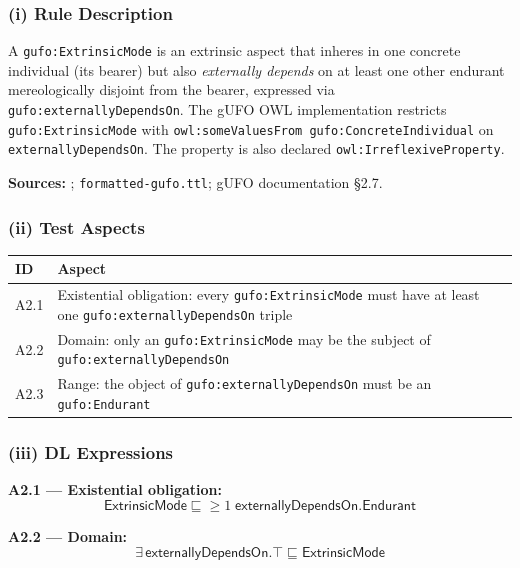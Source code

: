 \documentclass[12pt,a4paper]{article}
\newcommand{\gufoclass}[1]{\nolinkurl{gufo:#1}}
\newcommand{\gufoprop}[1]{\nolinkurl{gufo:#1}}
\begin{document}
\subsubsection*{(i) Rule Description}

A \gufoclass{ExtrinsicMode} is an extrinsic aspect that inheres in one concrete
individual (its bearer) but also \emph{externally depends} on at least one other
endurant mereologically disjoint from the bearer, expressed via
\gufoprop{externallyDependsOn}. The gUFO OWL implementation restricts
\gufoclass{ExtrinsicMode} with \nolinkurl{owl:someValuesFrom gufo:ConcreteIndividual}
on \texttt{externallyDependsOn}. The property is also declared
\nolinkurl{owl:IrreflexiveProperty}.

\textbf{Sources:} \citet{guizzardi2005}; \texttt{formatted-gufo.ttl};
gUFO documentation \S2.7.

\subsubsection*{(ii) Test Aspects}

\begin{tabular}{lL{10cm}}
  \toprule
  \textbf{ID} & \textbf{Aspect} \\
  \midrule
  A2.1 & Existential obligation: every \gufoclass{ExtrinsicMode} must have at
         least one \gufoprop{externallyDependsOn} triple \\
  A2.2 & Domain: only an \gufoclass{ExtrinsicMode} may be the subject of
         \gufoprop{externallyDependsOn} \\
  A2.3 & Range: the object of \gufoprop{externallyDependsOn} must be an
         \gufoclass{Endurant} \\
  \bottomrule
\end{tabular}

\subsubsection*{(iii) DL Expressions}

\textbf{A2.1 --- Existential obligation:}
\begin{equation*}
  \mathsf{ExtrinsicMode} \sqsubseteq {\geq}1\;\mathsf{externallyDependsOn}.\mathsf{Endurant}
\end{equation*}

\textbf{A2.2 --- Domain:}
\begin{equation*}
  \exists\,\mathsf{externallyDependsOn}.\top \sqsubseteq \mathsf{ExtrinsicMode}
\end{equation*}
\end{document}
